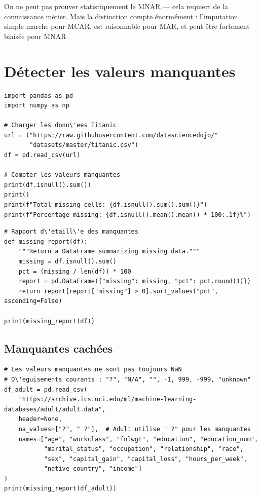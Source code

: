 \begin{warningbox}
On ne peut pas prouver statistiquement le MNAR --- cela requiert de la connaissance m\'etier. Mais la distinction compte \'enorm\'ement : l'imputation simple marche pour MCAR, est raisonnable pour MAR, et peut \^etre fortement biais\'ee pour MNAR.
\end{warningbox}

\section{D\'etecter les valeurs manquantes}

\begin{verbatim}
import pandas as pd
import numpy as np

# Charger les donn\'ees Titanic
url = ("https://raw.githubusercontent.com/datasciencedojo/"
       "datasets/master/titanic.csv")
df = pd.read_csv(url)

# Compter les valeurs manquantes
print(df.isnull().sum())
print()
print(f"Total missing cells: {df.isnull().sum().sum()}")
print(f"Percentage missing: {df.isnull().mean().mean() * 100:.1f}%")
\end{verbatim}

\begin{verbatim}
# Rapport d\'etaill\'e des manquantes
def missing_report(df):
    """Return a DataFrame summarizing missing data."""
    missing = df.isnull().sum()
    pct = (missing / len(df)) * 100
    report = pd.DataFrame({"missing": missing, "pct": pct.round(1)})
    return report[report["missing"] > 0].sort_values("pct", ascending=False)

print(missing_report(df))
\end{verbatim}

\subsection{Manquantes cach\'ees}

\begin{verbatim}
# Les valeurs manquantes ne sont pas toujours NaN
# D\'eguisements courants : "?", "N/A", "", -1, 999, -999, "unknown"
df_adult = pd.read_csv(
    "https://archive.ics.uci.edu/ml/machine-learning-databases/adult/adult.data",
    header=None,
    na_values=["?", " ?"],  # Adult utilise " ?" pour les manquantes
    names=["age", "workclass", "fnlwgt", "education", "education_num",
           "marital_status", "occupation", "relationship", "race",
           "sex", "capital_gain", "capital_loss", "hours_per_week",
           "native_country", "income"]
)
print(missing_report(df_adult))
\end{verbatim}

